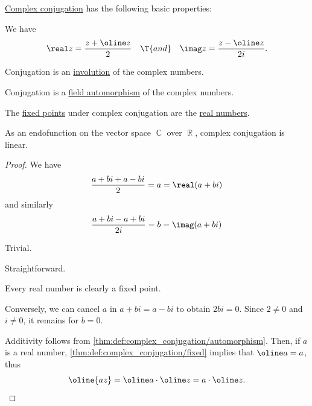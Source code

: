 \begin{proposition}\label{thm:def:complex_conjugation}
  \hyperref[def:complex_conjugation]{Complex conjugation} has the following basic properties:
  \begin{thmenum}
     We have
    \begin{align*}
      \real z = \frac {z + \oline z} 2
      &&\T{and}&&
      \imag z = \frac {z - \oline z} {2i}.
    \end{align*}

     Conjugation is an \hyperref[def:categorical_involution]{involution} of the complex numbers.

     Conjugation is a \hyperref[def:field/morphism]{field automorphism} of the complex numbers.

     The \hyperref[def:function_fixed_point]{fixed points} under complex conjugation are the \hyperref[def:real_numbers]{real numbers}.

     As an endofunction on the vector space \( \BbbC \) over \( \BbbR \), complex conjugation is linear.
  \end{thmenum}
\end{proposition}
\begin{proof}
   We have
  \begin{equation*}
    \frac {a + bi + a - bi} 2 = a = \real(a + bi)
  \end{equation*}
  and similarly
  \begin{equation*}
    \frac {a + bi - a + bi} {2i} = b = \imag(a + bi)
  \end{equation*}

   Trivial.

   Straightforward.

   Every real number is clearly a fixed point.

  Conversely, we can cancel \( a \) in \( a + bi = a - bi \) to obtain \( 2bi = 0 \). Since \( 2 \neq 0 \) and \( i \neq 0 \), it remains for \( b = 0 \).

   Additivity follows from \cref{thm:def:complex_conjugation/automorphism}. Then, if \( a \) is a real number, \cref{thm:def:complex_conjugation/fixed} implies that \( \oline a = a \), thus
  \begin{equation*}
    \oline {az} = \oline a \cdot \oline z = a \cdot \oline z.
  \end{equation*}
\end{proof}

